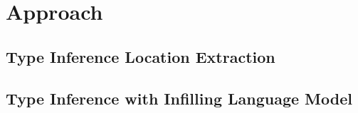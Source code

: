 \section{{\tool} Approach}
\label{sec:approach}




\subsection{Type Inference Location Extraction}


\subsection{Type Inference with Infilling Language Model}


